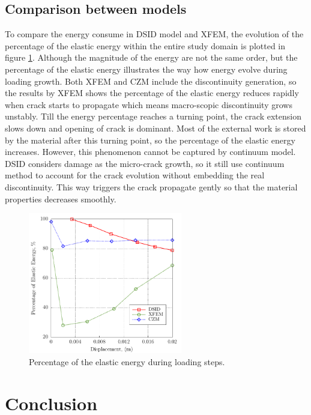 \documentclass[preprint,review,12pt]{elsarticle}
\begin{document}
\subsection{Comparison between models}
\noindent
To compare the energy consume in DSID model and XFEM, the evolution of the percentage of the elastic energy within the entire study domain is plotted in figure \ref{fig:Comparison}. Although the magnitude of the energy are not the same order, but the percentage of the elastic energy illustrates the way how energy evolve during loading growth. Both XFEM and CZM include the discontinuity generation, so the results by XFEM shows the percentage of the elastic energy reduces rapidly when crack starts to propagate which means macro-scopic discontinuity grows unstably. Till the energy percentage reaches a turning point, the crack extension slows down and opening of crack is dominant. Most of the external work is stored by the material after this turning point, so the percentage of the elastic energy increases. However, this phenomenon cannot be captured by continuum model. DSID considers damage as the micro-crack growth, so it still use continuum method to account for the crack evolution without embedding the real discontinuity. This way triggers the crack propagate gently so that the material properties decreases smoothly.
\
\\
\begin{figure}[htbp]
   \centering
  \includegraphics[width=0.6\textwidth]{Abaqus/Energy/plot_EP.pdf}
   \caption{Percentage of the elastic energy during loading steps. }
   \label{fig:Comparison}
\end{figure}
\section{Conclusion}
\end{document}
